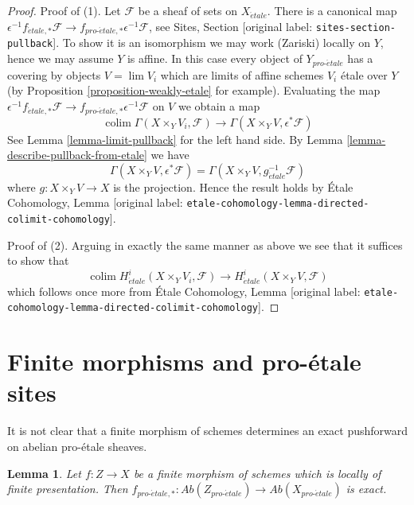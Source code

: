 \documentclass[10pt,a4paper]{article}
\theoremstyle{plain}
\newtheorem{lemma}[subsection]{Lemma}
\theoremstyle{definition}
\theoremstyle{remark}
\numberwithin{equation}{subsection}
\def\lim{\mathop{\mathrm{lim}}\nolimits}
\def\colim{\mathop{\mathrm{colim}}\nolimits}
\def\proetale{{pro\text{-}\acute{e}tale}}
\def\etale{{\acute{e}tale}}
\begin{document}
\begin{proof}
Proof of (1). Let $\mathcal{F}$ be a sheaf of sets on $X_\etale$. There
is a canonical map $\epsilon^{-1}f_{\etale, *}\mathcal{F} \to
f_{\proetale, *}\epsilon^{-1}\mathcal{F}$, see
Sites, Section \textnormal{[original label: \nolinkurl{sites-section-pullback}]}.
To show it is an isomorphism we may work (Zariski) locally on $Y$, hence
we may assume $Y$ is affine. In this case
every object of $Y_\proetale$ has a covering by objects $V = \lim V_i$
which are limits of affine schemes $V_i$ \'etale over $Y$ (by
Proposition \ref{proposition-weakly-etale}
for example). Evaluating the map
$\epsilon^{-1}f_{\etale, *}\mathcal{F} \to
f_{\proetale, *}\epsilon^{-1}\mathcal{F}$
on $V$ we obtain a map
$$
\colim \Gamma(X \times_Y V_i, \mathcal{F})
\longrightarrow
\Gamma(X \times_Y V, \epsilon^*\mathcal{F})
$$
See Lemma \ref{lemma-limit-pullback} for the left hand side.
By Lemma \ref{lemma-describe-pullback-from-etale} we have
$$
\Gamma(X \times_Y V, \epsilon^*\mathcal{F}) =
\Gamma(X \times_Y V, g_\etale^{-1}\mathcal{F})
$$
where $g : X \times_Y V \to X$ is the projection. Hence the result holds by
\'Etale Cohomology, Lemma
\textnormal{[original label: \nolinkurl{etale-cohomology-lemma-directed-colimit-cohomology}]}.

\medskip\noindent
Proof of (2). Arguing in exactly the same manner as above
we see that it suffices to show that
$$
\colim H^i_\etale(X \times_Y V_i, \mathcal{F})
\longrightarrow
H^i_\etale(X \times_Y V, \mathcal{F})
$$
which follows once more from \'Etale Cohomology, Lemma
\textnormal{[original label: \nolinkurl{etale-cohomology-lemma-directed-colimit-cohomology}]}.
\end{proof}







\section{Finite morphisms and pro-\'etale sites}
\label{section-finite}

\noindent
It is not clear that a finite morphism of schemes determines
an exact pushforward on abelian pro-\'etale sheaves.

\begin{lemma}
\label{lemma-finite}
Let $f : Z \to X$ be a finite morphism of schemes which is
locally of finite presentation. Then
$f_{\proetale, *} : \textit{Ab}(Z_\proetale) \to \textit{Ab}(X_\proetale)$
is exact.
\end{lemma}
\end{document}
